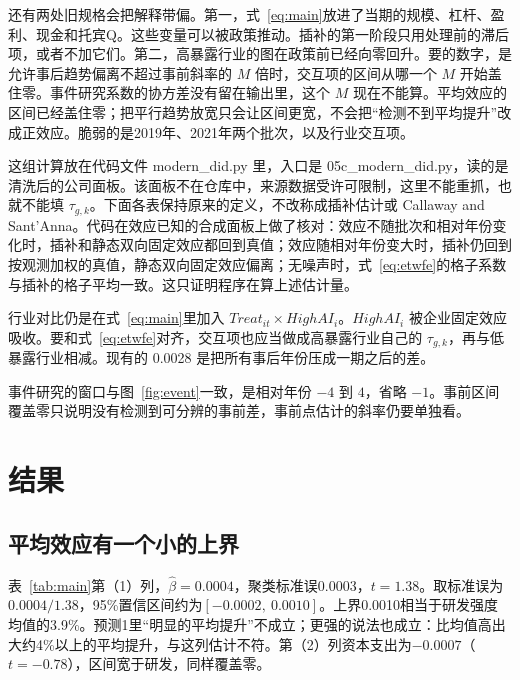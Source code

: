 \documentclass[12pt,hyperref,a4paper,UTF8]{ctexart}
\begin{document}
还有两处旧规格会把解释带偏。第一，式~\eqref{eq:main}放进了当期的规模、杠杆、盈利、现金和托宾Q。这些变量可以被政策推动。插补的第一阶段只用处理前的滞后项，或者不加它们。第二，高暴露行业的图在政策前已经向零回升。\textcite{rambachan2023credible}要的数字，是允许事后趋势偏离不超过事前斜率的 $M$ 倍时，交互项的区间从哪一个 $M$ 开始盖住零。事件研究系数的协方差没有留在输出里，这个 $M$ 现在不能算。平均效应的区间已经盖住零；把平行趋势放宽只会让区间更宽，不会把“检测不到平均提升”改成正效应。脆弱的是2019年、2021年两个批次，以及行业交互项。

这组计算放在代码文件 modern\_did.py 里，入口是 05c\_modern\_did.py，读的是清洗后的公司面板。该面板不在仓库中，来源数据受许可限制，这里不能重抓，也就不能填 $\tau_{g,k}$。下面各表保持原来的定义，不改称成插补估计或 Callaway and Sant'Anna。代码在效应已知的合成面板上做了核对：效应不随批次和相对年份变化时，插补和静态双向固定效应都回到真值；效应随相对年份变大时，插补仍回到按观测加权的真值，静态双向固定效应偏离；无噪声时，式~\eqref{eq:etwfe}的格子系数与插补的格子平均一致。这只证明程序在算上述估计量。

行业对比仍是在式~\eqref{eq:main}里加入 $Treat_{it}\times HighAI_i$。$HighAI_i$ 被企业固定效应吸收。要和式~\eqref{eq:etwfe}对齐，交互项也应当做成高暴露行业自己的 $\tau_{g,k}$，再与低暴露行业相减。现有的 0.0028 是把所有事后年份压成一期之后的差。

事件研究的窗口与图~\ref{fig:event}一致，是相对年份 $-4$ 到 $4$，省略 $-1$。事前区间覆盖零只说明没有检测到可分辨的事前差，事前点估计的斜率仍要单独看\parencite{roth2023trending,rambachan2023credible}。

\section{结果}

\subsection{平均效应有一个小的上界}

表~\ref{tab:main}第（1）列，$\hat\beta=0.0004$，聚类标准误0.0003，$t=1.38$。取标准误为$0.0004/1.38$，95\%置信区间约为$[-0.0002,\ 0.0010]$。上界0.0010相当于研发强度均值的3.9\%。预测1里“明显的平均提升”不成立；更强的说法也成立：比均值高出大约4\%以上的平均提升，与这列估计不符。第（2）列资本支出为$-0.0007$（$t=-0.78$），区间宽于研发，同样覆盖零。
\end{document}
